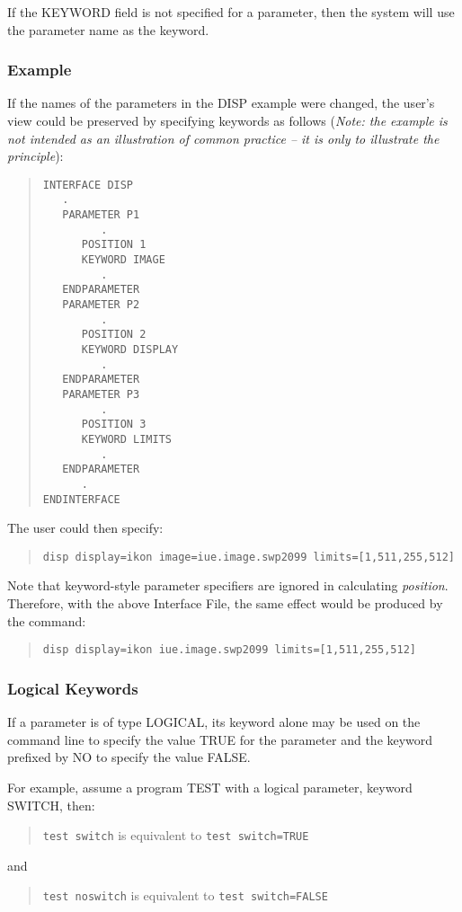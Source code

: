 \documentclass[twoside,11pt]{article}
\renewcommand{\_}{\texttt{\symbol{95}}}
\begin{document}
If the KEYWORD field is not specified for a parameter, then the system will
use the parameter name as the keyword.

\subsubsection*{Example}
If the names of the parameters in the DISP example were changed,
the user's view could be preserved by specifying keywords as follows
({\em Note: the example is not intended as an
illustration of common practice -- it is only to illustrate the
principle}\/):
\begin{quote} \begin{verbatim}
INTERFACE DISP
   .
   PARAMETER P1
         .
      POSITION 1
      KEYWORD IMAGE
         .
   ENDPARAMETER
   PARAMETER P2
         .
      POSITION 2
      KEYWORD DISPLAY
         .
   ENDPARAMETER
   PARAMETER P3
         .
      POSITION 3
      KEYWORD LIMITS
         .
   ENDPARAMETER
      .
ENDINTERFACE
\end{verbatim} \end{quote}
The user could then specify:
\begin{quote} \begin{verbatim}
disp display=ikon image=iue.image.swp2099 limits=[1,511,255,512]
\end{verbatim} \end{quote}
Note that keyword-style parameter specifiers are ignored in calculating
{\em position}.
Therefore, with the above Interface File, the same effect would be produced
by the command:
\begin{quote} \begin{verbatim}
disp display=ikon iue.image.swp2099 limits=[1,511,255,512]
\end{verbatim} \end{quote}

\subsubsection*{Logical Keywords}
If a parameter is of type \_LOGICAL, its keyword alone may be used on
the command line to specify the value TRUE for the parameter and the 
keyword prefixed by NO to specify the value FALSE.

For example, assume a program TEST with a logical parameter, keyword
SWITCH, then:
\begin{quote}
\texttt{test switch} is equivalent to \texttt{test switch=TRUE}
\end{quote}
and
\begin{quote}
\texttt{test noswitch} is equivalent to \texttt{test switch=FALSE}
\end{quote}
\end{document}
